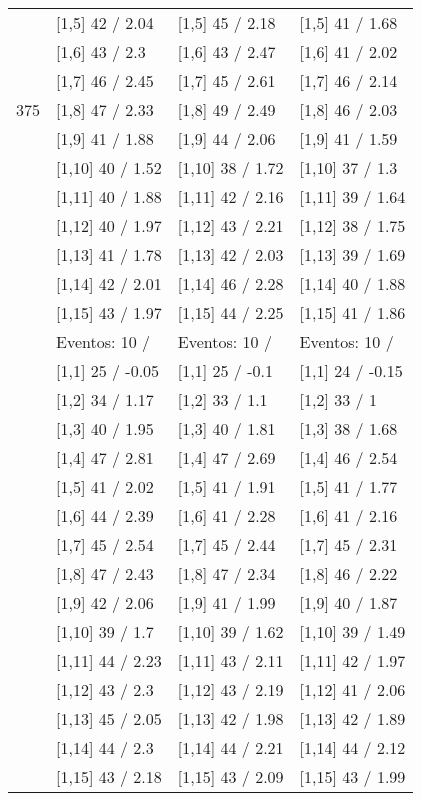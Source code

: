 \begin{table}
\begin{tabular}[t]{llll}
 & {}[1,5] 42  / 2.04 & {}[1,5] 45  / 2.18 & {}[1,5] 41  / 1.68\\
 & {}[1,6] 43  / 2.3 & {}[1,6] 43  / 2.47 & {}[1,6] 41  / 2.02\\
 & {}[1,7] 46  / 2.45 & {}[1,7] 45  / 2.61 & {}[1,7] 46  / 2.14\\
375 & {}[1,8] 47  / 2.33 & {}[1,8] 49  / 2.49 & {}[1,8] 46  / 2.03\\
\addlinespace
 & {}[1,9] 41  / 1.88 & {}[1,9] 44  / 2.06 & {}[1,9] 41  / 1.59\\
 & {}[1,10] 40  / 1.52 & {}[1,10] 38  / 1.72 & {}[1,10] 37  / 1.3\\
 & {}[1,11] 40  / 1.88 & {}[1,11] 42  / 2.16 & {}[1,11] 39  / 1.64\\
 & {}[1,12] 40  / 1.97 & {}[1,12] 43  / 2.21 & {}[1,12] 38  / 1.75\\
 & {}[1,13] 41  / 1.78 & {}[1,13] 42  / 2.03 & {}[1,13] 39  / 1.69\\
\addlinespace
 & {}[1,14] 42  / 2.01 & {}[1,14] 46  / 2.28 & {}[1,14] 40  / 1.88\\
 & {}[1,15] 43  / 1.97 & {}[1,15] 44  / 2.25 & {}[1,15] 41  / 1.86\\
 & Eventos:  10 / & Eventos:  10 / & Eventos:  10 /\\
 & {}[1,1] 25  / -0.05 & {}[1,1] 25  / -0.1 & {}[1,1] 24  / -0.15\\
 & {}[1,2] 34  / 1.17 & {}[1,2] 33  / 1.1 & {}[1,2] 33  / 1\\
\addlinespace
 & {}[1,3] 40  / 1.95 & {}[1,3] 40  / 1.81 & {}[1,3] 38  / 1.68\\
 & {}[1,4] 47  / 2.81 & {}[1,4] 47  / 2.69 & {}[1,4] 46  / 2.54\\
 & {}[1,5] 41  / 2.02 & {}[1,5] 41  / 1.91 & {}[1,5] 41  / 1.77\\
 & {}[1,6] 44  / 2.39 & {}[1,6] 41  / 2.28 & {}[1,6] 41  / 2.16\\
 & {}[1,7] 45  / 2.54 & {}[1,7] 45  / 2.44 & {}[1,7] 45  / 2.31\\
\addlinespace
500 & {}[1,8] 47  / 2.43 & {}[1,8] 47  / 2.34 & {}[1,8] 46  / 2.22\\
 & {}[1,9] 42  / 2.06 & {}[1,9] 41  / 1.99 & {}[1,9] 40  / 1.87\\
 & {}[1,10] 39  / 1.7 & {}[1,10] 39  / 1.62 & {}[1,10] 39  / 1.49\\
 & {}[1,11] 44  / 2.23 & {}[1,11] 43  / 2.11 & {}[1,11] 42  / 1.97\\
 & {}[1,12] 43  / 2.3 & {}[1,12] 43  / 2.19 & {}[1,12] 41  / 2.06\\
\addlinespace
 & {}[1,13] 45  / 2.05 & {}[1,13] 42  / 1.98 & {}[1,13] 42  / 1.89\\
 & {}[1,14] 44  / 2.3 & {}[1,14] 44  / 2.21 & {}[1,14] 44  / 2.12\\
 & {}[1,15] 43  / 2.18 & {}[1,15] 43  / 2.09 & {}[1,15] 43  / 1.99\\
\bottomrule
\end{tabular}
\end{table}
